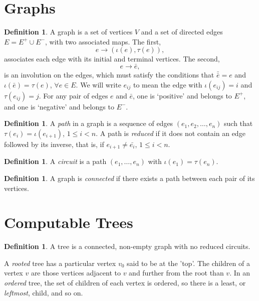 \documentclass[a4paper]{article}
\theoremstyle{plain}
\theoremstyle{definition}
\newtheorem{definition}[theorem]{Definition}
\begin{document}
\section{Graphs \label{graphs}}

\begin{definition}
A graph is a set of vertices $V$ and a set of directed edges $E = E^+ \cup E^-$, with two associated maps. The first,
\[ e \rightarrow (\iota(e), \tau(e)), \]
associates each edge with its initial and terminal vertices. The second,
\[ e \rightarrow \bar{e}, \]
is an involution on the edges, which must satisfy the conditions that $\bar{\bar{e}} = e$ and $\iota(\bar{e}) = \tau(e)$, $\forall e \in E$. We will write $e_{ij}$ to mean the edge with $\iota(e_{ij}) = i$ and $\tau(e_{ij})=j$. For any pair of edges $e$ and $\bar{e}$, one is `positive' and belongs to $E^+$, and one is `negative' and belongs to $E^-$.
\end{definition}

\begin{definition}
A {\it path} in a graph is a sequence of edges $(e_1, e_2, \dots, e_n)$ such that $\tau(e_i) = \iota(e_{i+1})$, $1 \leq i < n$. A path is {\it reduced} if it does not contain an edge followed by its inverse, that is, if $e_{i+1} \neq \bar{e_i}$, $1 \leq i < n$. 
\end{definition}

\begin{definition}
A {\it circuit} is a path $(e_1, \dots, e_n)$ with $\iota(e_1) = \tau(e_n)$. 
\end{definition}

\begin{definition}
A graph is {\it connected} if there exists a path between each pair of its vertices.
\end{definition}

\section{Computable Trees \label{trees}}

\begin{definition}
A tree is a connected, non-empty graph with no reduced circuits.

A {\it rooted} tree has a particular vertex $v_0$ said to be at the 'top'. The children of a vertex $v$ are those vertices adjacent to $v$ and further from the root than $v$. In an {\it ordered} tree, the set of children of each vertex is ordered, so there is a least, or {\it leftmost}, child, and so on. 
\end{definition}
\end{document}
